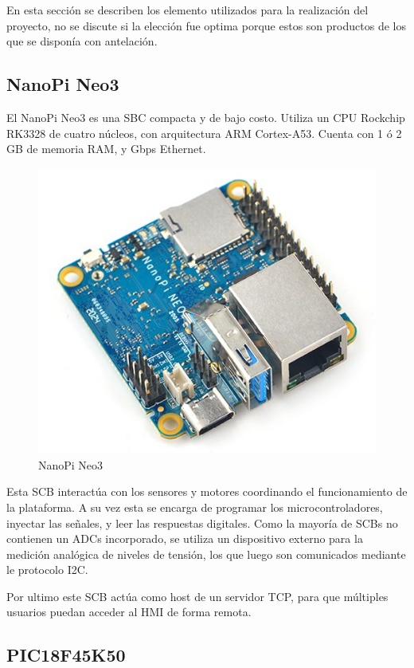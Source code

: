 \documentclass[12pt,letterpaper]{article}     %
\begin{document}
En esta sección se describen los elemento utilizados para la realización del proyecto, no se discute si la
elección fue optima porque estos son productos de los que se disponía con antelación.

\subsection{NanoPi Neo3}

El NanoPi Neo3 es una SBC compacta y de bajo costo. Utiliza un CPU Rockchip RK3328 de cuatro núcleos, con
arquitectura ARM Cortex-A53. Cuenta con 1 ó 2 GB de memoria RAM, y Gbps Ethernet. 

\begin{figure}[!ht]
\centering
\includegraphics[scale=0.5]{imagenes/naopi.jpg}
\caption{NanoPi Neo3}
\label{fig:pogopin}
\end{figure}

Esta SCB interactúa con los sensores y motores coordinando el funcionamiento de la plataforma.
A su vez esta se encarga de programar los microcontroladores, inyectar las señales, y leer 
las respuestas digitales. Como la mayoría de SCBs no contienen un ADCs incorporado, se utiliza
un dispositivo externo para la medición analógica de niveles de tensión, los que luego son
comunicados mediante le protocolo I2C.

Por ultimo este SCB actúa como host de un servidor TCP, para que múltiples usuarios puedan acceder
al HMI de forma remota.

\subsection{PIC18F45K50}
\end{document}
